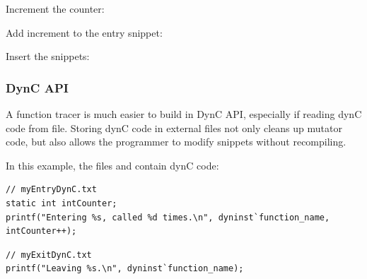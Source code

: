 Increment the counter:


Add increment to the entry snippet:


Insert the snippets:


\begin{center}
\end{center}

\pagebreak


\subsubsection{DynC API}

A function tracer is much easier to build in DynC API, especially if reading dynC code from file. Storing dynC code in external files not only cleans up mutator code, but also allows the programmer to modify snippets without recompiling.

\vspace{0.5cm}


\noindent In this example, the files  and  contain dynC code:

\begin{lstlisting}
// myEntryDynC.txt
static int intCounter;
printf("Entering %s, called %d times.\n", dyninst`function_name, intCounter++);
\end{lstlisting}

\begin{lstlisting}
// myExitDynC.txt
printf("Leaving %s.\n", dyninst`function_name);
\end{lstlisting}

